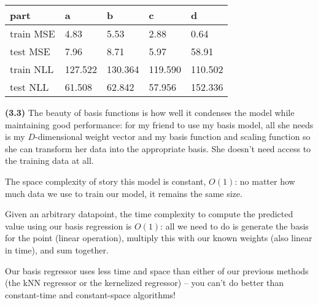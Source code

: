 \documentclass[submit]{harvardml}
\renewcommand{\part}[1] {\vspace{.10in} {\bf (#1)}}
\begin{document}
\begin{table}[hbt!]
  \begin{tabular}{lllll}
  \hline
  part      & a       & b       & c       & d       \\ \hline
  train MSE & 4.83    & 5.53    & 2.88    & 0.64    \\
  test MSE  & 7.96    & 8.71    & 5.97    & 58.91   \\
  train NLL & 127.522 & 130.364 & 119.590 & 110.502 \\
  test NLL  & 61.508  & 62.842  & 57.956  & 152.336 \\ \hline
  \end{tabular}
\end{table}

\part{3.3} The beauty of basis functions is how well it condenses the model while maintaining good performance: for my friend to use my basis model, all she needs is my $D$-dimensional weight vector and my basis function and scaling function so she can transform her data into the appropriate basis. She doesn't need access to the training data at all.

The space complexity of story this model is constant, $O(1)$:  no matter how much data we use to train our model, it remains the same size.

Given an arbitrary datapoint, the time complexity to compute the predicted value using our basis regression is $O(1)$: all we need to do is generate the basis for the point (linear operation), multiply this with our known weights (also linear in time), and sum together.

Our basis regressor uses less time and space than either of our previous methods (the kNN regressor or the kernelized regressor) -- you can't do better than constant-time and constant-space algorithms!


\newpage
\end{document}
